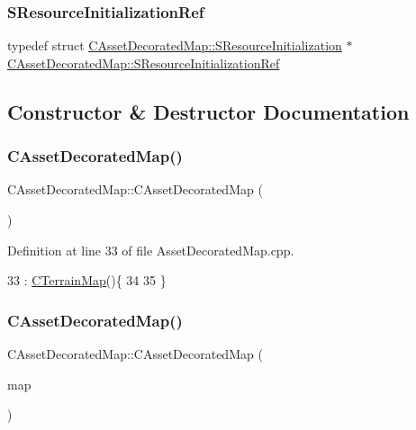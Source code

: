 \subsubsection{\texorpdfstring{S\+Resource\+Initialization\+Ref}{SResourceInitializationRef}}
{\footnotesize\ttfamily typedef  struct \hyperlink{structCAssetDecoratedMap_1_1SResourceInitialization}{C\+Asset\+Decorated\+Map\+::\+S\+Resource\+Initialization} $\ast$ \hyperlink{classCAssetDecoratedMap_a0ec7974cf6754e6891f10774ddafa527}{C\+Asset\+Decorated\+Map\+::\+S\+Resource\+Initialization\+Ref}}



\subsection{Constructor \& Destructor Documentation}
\hypertarget{classCAssetDecoratedMap_abdcbf60806b5a6b56b61381fd43dfaf8}{}\label{classCAssetDecoratedMap_abdcbf60806b5a6b56b61381fd43dfaf8} 
\subsubsection{\texorpdfstring{C\+Asset\+Decorated\+Map()}{CAssetDecoratedMap()}\hspace{0.1cm}{\footnotesize\ttfamily [1/3]}}
{\footnotesize\ttfamily C\+Asset\+Decorated\+Map\+::\+C\+Asset\+Decorated\+Map (\begin{DoxyParamCaption}{ }\end{DoxyParamCaption})}



Definition at line 33 of file Asset\+Decorated\+Map.\+cpp.


\begin{DoxyCode}
33                                        : \hyperlink{classCTerrainMap_a2ac9c0f2622d06b8e0b1f5d67199f1ea}{CTerrainMap}()\{
34     
35 \}
\end{DoxyCode}
\hypertarget{classCAssetDecoratedMap_a33d7e91120fbd0c954761ee4b3d0a043}{}\label{classCAssetDecoratedMap_a33d7e91120fbd0c954761ee4b3d0a043} 
\subsubsection{\texorpdfstring{C\+Asset\+Decorated\+Map()}{CAssetDecoratedMap()}\hspace{0.1cm}{\footnotesize\ttfamily [2/3]}}
{\footnotesize\ttfamily C\+Asset\+Decorated\+Map\+::\+C\+Asset\+Decorated\+Map (\begin{DoxyParamCaption}\item[{const \hyperlink{classCAssetDecoratedMap}{C\+Asset\+Decorated\+Map} \&}]{map }\end{DoxyParamCaption})}



